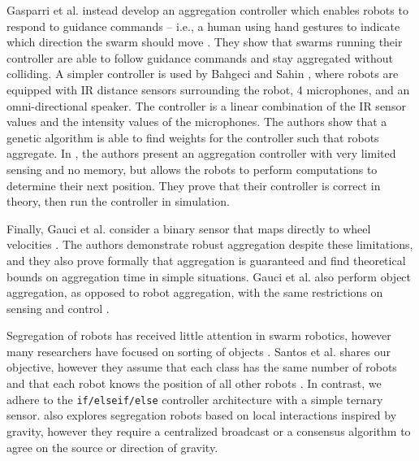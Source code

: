 \documentclass[conference]{IEEEtran}
\begin{document}
   Gasparri et al. instead develop an aggregation controller which enables robots to respond to guidance commands -- i.e., a human using hand gestures to indicate which direction the swarm should move \cite{gasparri_swarm_2012}. They show that swarms running their controller are able to follow guidance commands and stay aggregated without colliding. A simpler controller is used by Bahgeci and Sahin \cite{bahgeci_evolving_2005}, where robots are equipped with IR distance sensors surrounding the robot, 4 microphones, and an omni-directional speaker. The controller is a linear combination of the IR sensor values and the intensity values of the microphones. The authors show that a genetic algorithm is able to find weights for the controller such that robots aggregate. In \cite{ando_distributed_1999}, the authors present an aggregation controller with very limited sensing and no memory, but allows the robots to perform computations to determine their next position. They prove that their controller is correct in theory, then run the controller in simulation.

    Finally, Gauci et al. consider a binary sensor that maps directly to wheel velocities \cite{gauci_self-organized_2014}. The authors demonstrate robust aggregation despite these limitations, and they also prove formally that aggregation is guaranteed and find theoretical bounds on aggregation time in simple situations. Gauci et al. also perform object aggregation, as opposed to robot aggregation, with the same restrictions on sensing and control \cite{gauci_clustering_2014}.

    Segregation of robots has received little attention in swarm robotics, however many researchers have focused on sorting of objects \cite{vardy_accelerated_2012} \cite{holland_collective_1998} \cite{tao_wang_collective_2004} \cite{holland_stigmergy_1999}. Santos et al. shares our objective, however they assume that each class has the same number of robots and that each robot knows the position of all other robots \cite{santos_segregation_2014}. In contrast, we adhere to the \texttt{if/elseif/else} controller architecture with a simple ternary sensor. \cite{gross_segregation_2009} also explores segregation robots based on local interactions inspired by gravity, however they require a centralized broadcast or a consensus algorithm to agree on the source or direction of gravity.

\end{document}
